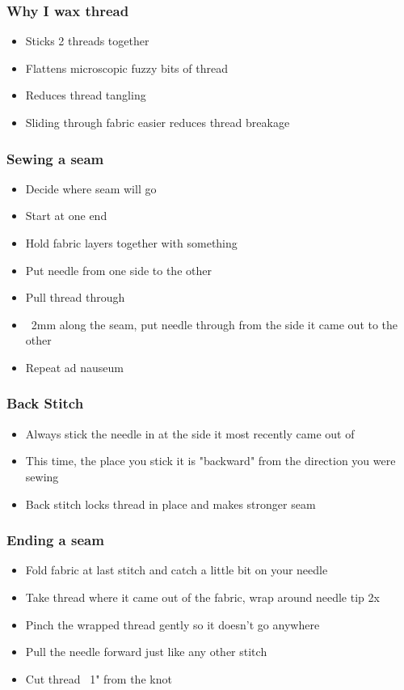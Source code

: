 \documentclass{beamer}
\begin{document}
\begin{frame}[fragile]
\frametitle{Why I wax thread}
\begin{itemize}
\item Sticks 2 threads together
\item Flattens microscopic fuzzy bits of thread
\item Reduces thread tangling
\item Sliding through fabric easier reduces thread breakage
\end{itemize}
\end{frame}

\begin{frame}[fragile]
\frametitle{Sewing a seam}
\begin{itemize}
\item Decide where seam will go
\item Start at one end
\item Hold fabric layers together with something
\item Put needle from one side to the other
\item Pull thread through
\item ~2mm along the seam, put needle through from the side it came out to the other
\item Repeat ad nauseum
\end{itemize}
\end{frame}

\begin{frame}[fragile]
\frametitle{Back Stitch}
\begin{itemize}
\item Always stick the needle in at the side it most recently came out of
\item This time, the place you stick it is "backward" from the direction you were sewing
\item Back stitch locks thread in place and makes stronger seam
\end{itemize}
\end{frame}

\begin{frame}[fragile]
\frametitle{Ending a seam}
\begin{itemize}
\item Fold fabric at last stitch and catch a little bit on your needle
\item Take thread where it came out of the fabric, wrap around needle tip 2x
\item Pinch the wrapped thread gently so it doesn't go anywhere
\item Pull the needle forward just like any other stitch
\item Cut thread ~1" from the knot
\end{itemize}
\end{frame}
\end{document}

